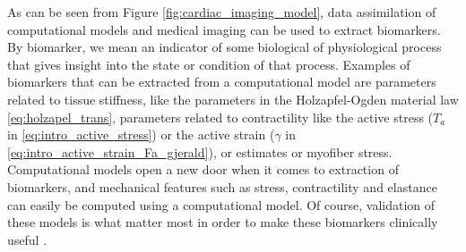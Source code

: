 As can be seen from Figure \ref{fig:cardiac_imaging_model}, data
assimilation of computational models and medical imaging can be used to
extract biomarkers. By biomarker, we mean an indicator of some
biological of physiological process that gives insight into the state
or condition of that process. Examples of biomarkers that can be
extracted from a computational model are parameters related to tissue
stiffness, like the parameters in the Holzapfel-Ogden material law
\eqref{eq:holzapel_trans}, parameters related to contractility like
the active stress ($T_a$ in \eqref{eq:intro_active_stress}) or the
active strain ($\gamma$ in \eqref{eq:intro_active_strain_Fa_gjerald}),
or estimates or myofiber stress.
Computational models open a new door when it comes to extraction of
biomarkers, and mechanical features such as stress, contractility and
elastance can easily be computed using a computational model. Of
course, validation of these models is what matter most in order to
make these biomarkers clinically useful \cite{caruel2014dimensional}. 









